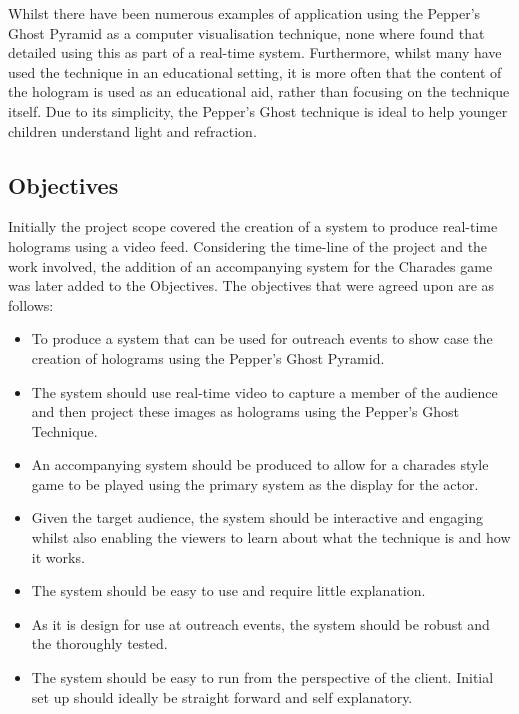 Whilst there have been numerous examples of application using the Pepper's Ghost Pyramid as a computer visualisation technique, none where found that detailed using this as part of a real-time system. Furthermore, whilst many have used the technique in an educational setting, it is more often that the content of the hologram is used as an educational aid, rather than focusing on the technique itself. Due to its simplicity, the Pepper's Ghost technique is ideal to help younger children understand light and refraction.  

\subsection{Objectives}
Initially the project scope covered the creation of a system to produce real-time holograms using a video feed. Considering the time-line of the project and the work involved, the addition of an accompanying system for the Charades game was later added to the Objectives.
The objectives that were agreed upon are as follows:
\begin{itemize}
	\item To produce a system that can be used for outreach events to show case the creation of holograms using the Pepper's Ghost Pyramid.
	
	\item The system should use real-time video to capture a member of the audience and then project these images as holograms using the Pepper's Ghost Technique.
	
	\item An accompanying system should be produced to allow for a charades style game to be played using the primary system as the display for the actor.
	
	\item Given the target audience, the system should be interactive and engaging whilst also enabling the viewers to learn about what the technique is and how it works.
	
	\item The system should be easy to use and require little explanation.
	
	\item As it is design for use at outreach events, the system should be robust and the thoroughly tested.
	
	\item The system should be easy to run from the perspective of the client. Initial set up should ideally be straight forward and self explanatory.
\end{itemize}


